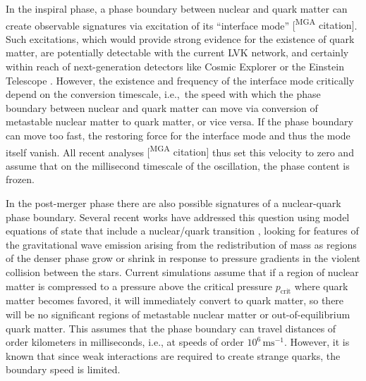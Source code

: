 \documentclass[10pt,superscriptaddress,
amsmath,aps,prl,twocolumn,nofootinbib]{revtex4-1}
\newcommand{\mga}[1]{{\color[rgb]{0.8,0,0}#1}}
\newcommand{\mgacom}[1]{\textsf{\color[rgb]{0.6,0,0}[\textsuperscript{MGA} #1]}}
\newcommand{\AH}[1]{{\color{cyan}#1}}
\newcommand{\m}{\text{m}}
\newcommand{\s}{\text{s}}
\begin{document}
\AH{In the inspiral phase, \mga{a phase boundary between nuclear and quark matter
can create observable signatures via excitation of its ``interface mode'' \mgacom{citation}.
Such excitations,}
which would provide strong evidence for the existence of quark matter, are potentially detectable with the current LVK network, and certainly within reach of next-generation detectors like Cosmic Explorer or the Einstein Telescope \cite{Counsell:2025hcv,Pereira:2025xsi}. However, the existence and frequency of the interface mode critically depend on the conversion timescale, i.e.,~the speed with which the phase boundary between nuclear and quark matter can move \mga{via conversion of metastable nuclear matter to quark matter, or vice versa}. If the phase boundary can move too fast, the restoring force for the interface mode and thus the mode itself vanish. All recent analyses \mgacom{citation} thus set this velocity to zero and assume that on the millisecond timescale of the oscillation, the phase content is frozen.}

\mga{In the post-merger phase there are also possible signatures of
a nuclear-quark phase boundary.}
Several recent works have addressed this question using model equations of state that include a nuclear/quark transition \cite{Most:2018eaw,Bauswein:2018bma,Espino:2023llj,Weih:2019xvw,Harada:2023eyg,Bauswein:2020ggy,Haque:2022dsc,Fujimoto:2022xhv,Christian:2023hez,Fujimoto:2024ymt},
\mga{looking for features of the gravitational wave emission arising}
from the redistribution of mass
as regions of the denser phase grow or shrink in response to pressure gradients in the violent collision between the stars. 
Current simulations assume that if a region of nuclear matter is compressed to a pressure above the critical pressure $p_\text{crit}$ where quark matter becomes favored, it will immediately convert to quark matter,
so there will be no significant regions of metastable nuclear matter
\mga{or out-of-equilibrium quark matter}. This assumes that the phase boundary can travel distances of order kilometers in milliseconds, i.e., at speeds of order $10^6\,\m\s^{-1}$. However, it is known that since weak interactions are required to create strange quarks, the boundary speed is limited.
\end{document}
